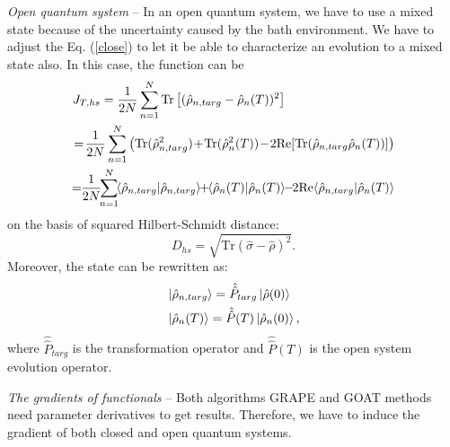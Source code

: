 \textit{Open quantum system} -- In an open quantum system, we have to use a mixed state because of the uncertainty caused by the bath environment. We have to adjust the Eq. (\ref{close}) to let it be able to characterize an evolution to a mixed state also. In this case, the function can be
\begin{equation}
    \begin{split}
        &J_{T,hs}=\frac{1}{2N}\sum_{n=1}^{N}\text{Tr}\left[(\hat{\rho}_{n,targ}-\hat{\rho}_{n}(T))^{2}\right]\\
        &\!=\!\frac{1}{2N}\sum_{n=1}^{N}\left(\text{Tr}(\hat{\rho}^{2}_{n,targ})\!+\!\text{Tr}(\hat{\rho}^{2}_{n}(T))\!-\!2\mathrm{Re}[\text{Tr}(\hat{\rho}_{n,targ}\hat{\rho}_{n}(T))]\right)\\
        &\!\!=\!\!\frac{1}{2N}\!\!\sum_{n=1}^{N}\!\!\braket{\hat{\rho}_{n,targ}|\hat{\rho}_{n,targ}}\!\!+\!\!\braket{\hat{\rho}_{n}(T)|\hat{\rho}_{n}(T)}\!\!-\!\!2\mathrm{Re}\!\braket{{\hat{\rho}_{n,targ}|\hat{\rho}_{n}(T)}}
    \end{split}
\end{equation}
on the basis of squared Hilbert-Schmidt distance:
\begin{equation}
    D_{hs}=\sqrt{\mathrm{Tr}(\hat{\sigma}-\hat{\rho})^{2}}.
\end{equation}
Moreover, the state can be rewritten as:
\begin{equation}
    \begin{split}
        &\ket{\hat{\rho}_{n,targ}}=\hat{\hat{P}}_{targ}\ket{\hat{\rho}(0)}\\
        &\ket{\hat{\rho}_{n}(T)}=\hat{\hat{P}}(T)\ket{\hat{\rho}_{n}(0)},
    \end{split}
\end{equation}
where $\hat{\hat{P}}_{targ}$ is the transformation operator and $\hat{\hat{P}}(T)$ is the open system evolution operator.

\textit{The gradients of functionals} -- Both algorithms GRAPE and GOAT methods need parameter derivatives to get results. Therefore, we have to induce the gradient of both closed and open quantum systems.

